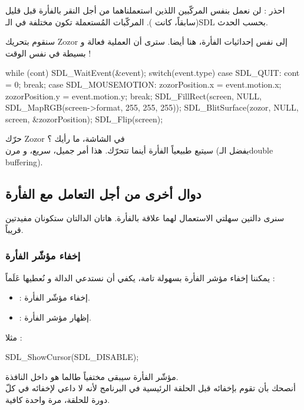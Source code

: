 \begin{warning}
احذر : لن نعمل بنفس المركّبين اللذين استعملناهما من أجل النقر بالفأرة قبل قليل (سابقاً، كانت
).
المركّبات المُستعملة تكون مختلفة في الـ\textenglish{SDL}
بحسب الحدث.
\end{warning}

سنقوم بتحريك
\textenglish{Zozor}
إلى نفس إحداثيات الفأرة، هنا أيضا. سترى أن العملية فعالة و بسيطة في نفس الوقت !

\begin{Csource}
while (cont)
{
	SDL_WaitEvent(&event);
	switch(event.type)
	{
		case SDL_QUIT:
		cont = 0;
		break;
		case SDL_MOUSEMOTION:
		zozorPosition.x = event.motion.x;
		zozorPosition.y = event.motion.y;
		break;
	}
	SDL_FillRect(screen, NULL, SDL_MapRGB(screen->format, 255, 255, 255));
	SDL_BlitSurface(zozor, NULL, screen, &zozorPosition); 
	SDL_Flip(screen);
}
\end{Csource}

حرّك
\textenglish{Zozor}
في الشاشة، ما رأيك ؟\\
سيتبع طبيعياً الفأرة أينما تتحرّك. هذا أمر جميل، سريع، و مرن (بفضل الـ\textenglish{double buffering}).

\subsection{دوال أخرى من أجل التعامل مع الفأرة}

سنرى دالتين سهلتي الاستعمال لهما علاقة بالفأرة. هاتان الدالتان ستكونان مفيدتين قريباً.

\subsubsection{إخفاء مؤشّر الفأرة}

يمكننا إخفاء مؤشر الفأرة بسهولة تامة، يكفي أن نستدعي الدالة
و نُعطيها عَلَماً :

\begin{itemize}
	\item {} :
	إخفاء مؤشّر الفأرة.
	\item {} :
	إظهار مؤشر الفأرة.
\end{itemize}
مثلا :

\begin{Csource}
SDL_ShowCursor(SDL_DISABLE);
\end{Csource}

مؤشّر الفأرة سيبقى مختفياً طالما هو داخل النافذة.\\
أنصحك بأن تقوم بإخفائه قبل الحلقة الرئيسية في البرنامج لأنه لا داعي لإخفائه في كلّ دورة للحلقة، مرة واحدة كافية.

